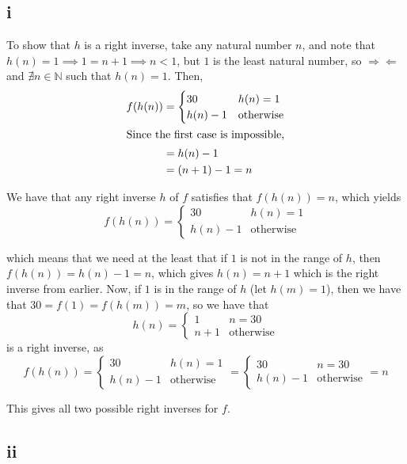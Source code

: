 \documentclass[12pt,letterpaper]{article}
\theoremstyle{definition}
\newcommand{\contra}{\Rightarrow\!\Leftarrow}
\newcommand{\N}{\mathbb{N}}
\begin{document}
\subsection*{i}

To show that $h$ is a right inverse, take any natural number $n$, and note that
$h(n) = 1 \implies 1 = n + 1 \implies n < 1$, but $1$ is the least natural number, so $\contra$
and $\nexists n \in \N$ such that $h(n) = 1$. Then,
\begin{align*}
  f(h(n)) &=
  \begin{cases}
    30 & h(n) = 1 \\
    h(n) - 1 & \text{otherwise}
  \end{cases} \\
  \intertext{Since the first case is impossible,}
          &= h(n) - 1 \\
          &= (n + 1) - 1 = n
\end{align*}


We have that any right inverse $h$ of $f$ satisfies that $f(h(n)) = n$, which
yields
\[
  f(h(n)) =
  \begin{cases}
    30 & h(n) = 1 \\
    h(n) - 1 & \text{otherwise}
  \end{cases} 
\]

which means that we need at the least that if $1$ is not in the range of $h$,
then $f(h(n)) = h(n) - 1 = n$, which gives $h(n) = n + 1$ which is the right
inverse from earlier. Now, if $1$ is in the
range of $h$ (let $h(m) = 1$), then we have that $30 = f(1) = f(h(m)) = m$, so
we have that 
\[
  h(n) =
  \begin{cases}
    1 & n = 30 \\
    n + 1 & \text{otherwise}
  \end{cases}
\]
is a right inverse, as
\[
  f(h(n)) =
  \begin{cases}
    30 & h(n) = 1 \\
    h(n) - 1 & \text{otherwise}
  \end{cases} =
  \begin{cases}
    30 & n = 30 \\
    h(n) - 1 & \text{otherwise}
  \end{cases} = n
\]

This gives all two possible right inverses for $f$.

\subsection*{ii}
\end{document}
